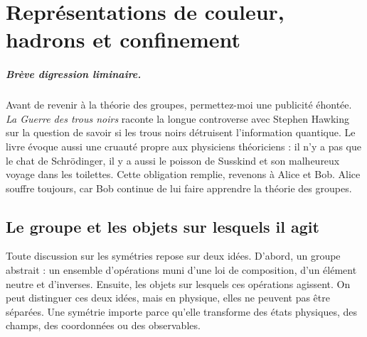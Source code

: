 \chapter{Représentations de couleur, hadrons et confinement}

\paragraph{Brève digression liminaire.}
Avant de revenir à la théorie des groupes, permettez-moi une publicité éhontée. \emph{La Guerre des trous noirs} raconte la longue controverse avec Stephen Hawking sur la question de savoir si les trous noirs détruisent l’information quantique. Le livre évoque aussi une cruauté propre aux physiciens théoriciens : il n’y a pas que le chat de Schrödinger, il y a aussi le poisson de Susskind et son malheureux voyage dans les toilettes. Cette obligation remplie, revenons à Alice et Bob. Alice souffre toujours, car Bob continue de lui faire apprendre la théorie des groupes.


\section{Le groupe et les objets sur lesquels il agit}

Toute discussion sur les symétries repose sur deux idées. D’abord, un groupe abstrait : un ensemble d’opérations muni d’une loi de composition, d’un élément neutre et d’inverses. Ensuite, les objets sur lesquels ces opérations agissent. On peut distinguer ces deux idées, mais en physique, elles ne peuvent pas être séparées. Une symétrie importe parce qu’elle transforme des états physiques, des champs, des coordonnées ou des observables.

\begin{classroomqa}
\end{classroomqa}

